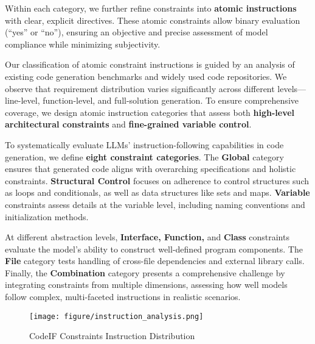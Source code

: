 Within each category, we further refine constraints into \textbf{atomic instructions} with clear, explicit directives. These atomic constraints allow binary evaluation (``yes'' or ``no''), ensuring an objective and precise assessment of model compliance while minimizing subjectivity.

Our classification of atomic constraint instructions is guided by an analysis of existing code generation benchmarks and widely used code repositories. We observe that requirement distribution varies significantly across different levels—line-level, function-level, and full-solution generation. To ensure comprehensive coverage, we design atomic instruction categories that assess both \textbf{high-level architectural constraints} and \textbf{fine-grained variable control}.

To systematically evaluate LLMs’ instruction-following capabilities in code generation, we define \textbf{eight constraint categories}. The \textbf{Global} category ensures that generated code aligns with overarching specifications and holistic constraints. \textbf{Structural Control} focuses on adherence to control structures such as loops and conditionals, as well as data structures like sets and maps. \textbf{Variable} constraints assess details at the variable level, including naming conventions and initialization methods.

At different abstraction levels, \textbf{Interface, Function,} and \textbf{Class} constraints evaluate the model’s ability to construct well-defined program components. The \textbf{File} category tests handling of cross-file dependencies and external library calls. Finally, the \textbf{Combination} category presents a comprehensive challenge by integrating constraints from multiple dimensions, assessing how well models follow complex, multi-faceted instructions in realistic scenarios.





\begin{figure}
    \centering
    \texttt{[image: figure/instruction\_analysis.png]}
    \caption{ CodeIF Constraints Instruction Distribution}
    \label{fig:instruction_analysis}
\end{figure}


